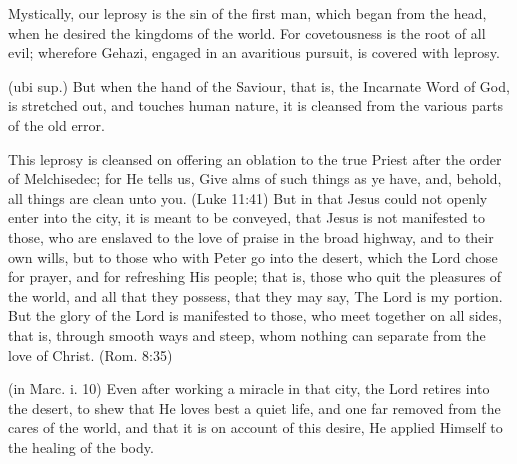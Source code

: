 Mystically, our leprosy is the sin of the first man, which began from the head, when he desired the kingdoms of the world. For covetousness is the root of all evil; wherefore Gehazi, engaged in an avaritious pursuit, is covered with leprosy.

 (ubi sup.) But when the hand of the Saviour, that is, the Incarnate Word of God, is stretched out, and touches human nature, it is cleansed from the various parts of the old error.

 This leprosy is cleansed on offering an oblation to the true Priest after the order of Melchisedec; for He tells us, Give alms of such things as ye have, and, behold, all things are clean unto you. (Luke 11:41) But in that Jesus could not openly enter into the city, it is meant to be conveyed, that Jesus is not manifested to those, who are enslaved to the love of praise in the broad highway, and to their own wills, but to those who with Peter go into the desert, which the Lord chose for prayer, and for refreshing His people; that is, those who quit the pleasures of the world, and all that they possess, that they may say, The Lord is my portion. But the glory of the Lord is manifested to those, who meet together on all sides, that is, through smooth ways and steep, whom nothing can separate from the love of Christ. (Rom. 8:35)

 (in Marc. i. 10) Even after working a miracle in that city, the Lord retires into the desert, to shew that He loves best a quiet life, and one far removed from the cares of the world, and that it is on account of this desire, He applied Himself to the healing of the body.


 

